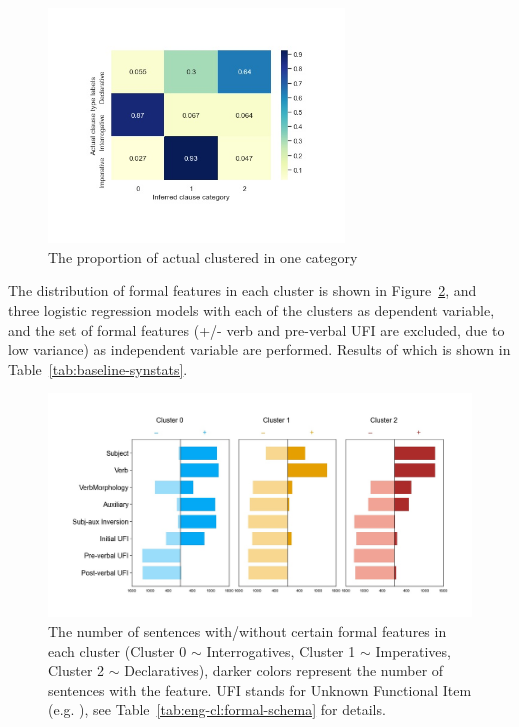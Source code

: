 \begin{figure}[H]
    \centering
    \includegraphics[width=0.7\textwidth]{figures/baseline-heatrev.jpg}
    \caption{The proportion of actual \diis{} clustered in one category}
    \label{fig:baseline-heatrev}
\end{figure}

The distribution of formal features in each cluster is shown in Figure~\ref{fig:baseline-syncluster}, and three logistic regression models with each of the clusters as dependent variable, and the set of formal features (+/- verb and pre-verbal UFI are excluded, due to low variance) as independent variable are performed. Results of which is shown in Table~\ref{tab:baseline-synstats}.

\begin{figure}[H]
    \centering
    \includegraphics[width=1\textwidth]{figures/baseline-syncluster.jpg}
    \caption{The number of sentences with/without certain formal features in each cluster (Cluster 0 $\sim$ Interrogatives, Cluster 1 $\sim$ Imperatives, Cluster 2 $\sim$ Declaratives), darker colors represent the number of sentences with the feature. UFI stands for Unknown Functional Item (e.g. \twh{}), see Table~\ref{tab:eng-cl:formal-schema} for details.}
    \label{fig:baseline-syncluster}
\end{figure}

